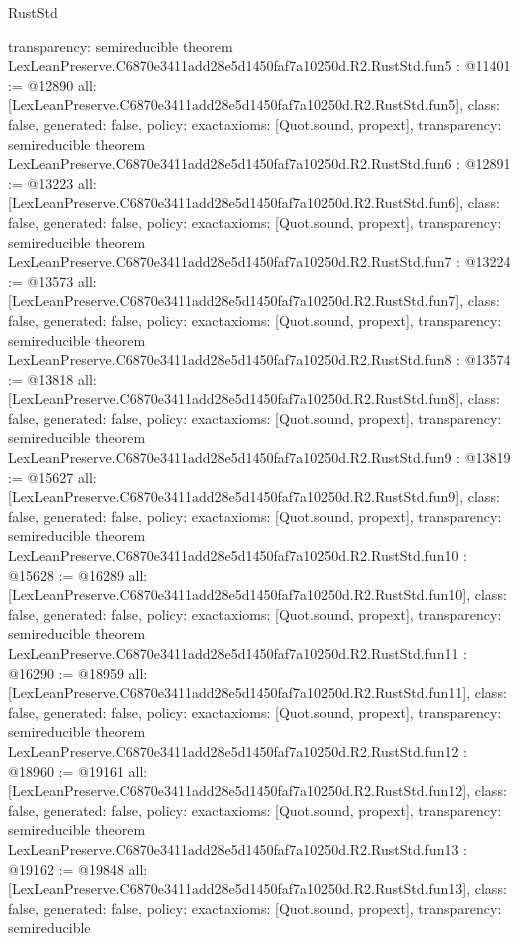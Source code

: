 \begin{lexlean}{RustStd}
\begin{coremodule}
{  transparency: semireducible
}
theorem LexLeanPreserve.C6870e3411add28e5d1450faf7a10250d.R2.RustStd.fun5 : @11401 := @12890 {
  all: [LexLeanPreserve.C6870e3411add28e5d1450faf7a10250d.R2.RustStd.fun5],
  class: false,
  generated: false,
  policy: exact{axioms: [Quot.sound, propext]},
  transparency: semireducible
}
theorem LexLeanPreserve.C6870e3411add28e5d1450faf7a10250d.R2.RustStd.fun6 : @12891 := @13223 {
  all: [LexLeanPreserve.C6870e3411add28e5d1450faf7a10250d.R2.RustStd.fun6],
  class: false,
  generated: false,
  policy: exact{axioms: [Quot.sound, propext]},
  transparency: semireducible
}
theorem LexLeanPreserve.C6870e3411add28e5d1450faf7a10250d.R2.RustStd.fun7 : @13224 := @13573 {
  all: [LexLeanPreserve.C6870e3411add28e5d1450faf7a10250d.R2.RustStd.fun7],
  class: false,
  generated: false,
  policy: exact{axioms: [Quot.sound, propext]},
  transparency: semireducible
}
theorem LexLeanPreserve.C6870e3411add28e5d1450faf7a10250d.R2.RustStd.fun8 : @13574 := @13818 {
  all: [LexLeanPreserve.C6870e3411add28e5d1450faf7a10250d.R2.RustStd.fun8],
  class: false,
  generated: false,
  policy: exact{axioms: [Quot.sound, propext]},
  transparency: semireducible
}
theorem LexLeanPreserve.C6870e3411add28e5d1450faf7a10250d.R2.RustStd.fun9 : @13819 := @15627 {
  all: [LexLeanPreserve.C6870e3411add28e5d1450faf7a10250d.R2.RustStd.fun9],
  class: false,
  generated: false,
  policy: exact{axioms: [Quot.sound, propext]},
  transparency: semireducible
}
theorem LexLeanPreserve.C6870e3411add28e5d1450faf7a10250d.R2.RustStd.fun10 : @15628 := @16289 {
  all: [LexLeanPreserve.C6870e3411add28e5d1450faf7a10250d.R2.RustStd.fun10],
  class: false,
  generated: false,
  policy: exact{axioms: [Quot.sound, propext]},
  transparency: semireducible
}
theorem LexLeanPreserve.C6870e3411add28e5d1450faf7a10250d.R2.RustStd.fun11 : @16290 := @18959 {
  all: [LexLeanPreserve.C6870e3411add28e5d1450faf7a10250d.R2.RustStd.fun11],
  class: false,
  generated: false,
  policy: exact{axioms: [Quot.sound, propext]},
  transparency: semireducible
}
theorem LexLeanPreserve.C6870e3411add28e5d1450faf7a10250d.R2.RustStd.fun12 : @18960 := @19161 {
  all: [LexLeanPreserve.C6870e3411add28e5d1450faf7a10250d.R2.RustStd.fun12],
  class: false,
  generated: false,
  policy: exact{axioms: [Quot.sound, propext]},
  transparency: semireducible
}
theorem LexLeanPreserve.C6870e3411add28e5d1450faf7a10250d.R2.RustStd.fun13 : @19162 := @19848 {
  all: [LexLeanPreserve.C6870e3411add28e5d1450faf7a10250d.R2.RustStd.fun13],
  class: false,
  generated: false,
  policy: exact{axioms: [Quot.sound, propext]},
  transparency: semireducible
}
\end{coremodule}
\end{lexlean}

